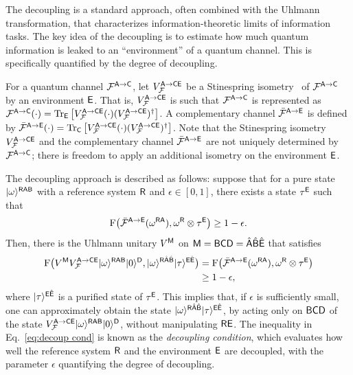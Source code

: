 The decoupling is a standard approach, often combined with the Uhlmann transformation, that characterizes information-theoretic limits of information tasks.
The key idea of the decoupling is to estimate how much quantum information is leaked to an ``environment'' of a quantum channel. This is specifically quantified by the degree of decoupling.


For a quantum channel $\cF^{\sA\rarr\sC}$, let $V_\cF^{\sA \rarr \sC\sE}$ be a Stinespring isometry~\cite{stinespring1955} of $\cF^{\sA \rarr \sC}$ by an environment $\sE$.
That is, $V_\cF^{\sA \rarr \sC\sE}$ is such that $\cF^{\sA\rarr \sC}$ is represented as $\cF^{\sA \rarr \sC}(\cdot) = \tr_{\sE}\big[V_\cF^{\sA\rarr \sC\sE}(\cdot)(V_\cF^{\sA \rarr \sC\sE})^\dag\big]$.
A complementary channel $\bar{\cF}^{\sA\rarr\sE}$ is defined by $\bar{\cF}^{\sA\rarr\sE}(\cdot) = \tr_\sC\big[V_\cF^{\sA\rarr\sC\sE}(\cdot)(V_\cF^{\sA\rarr\sC\sE})^\dag\big]$.
Note that the Stinespring isometry $V_\cF^{\sA \rarr \sC\sE}$ and the complementary channel $\bar{\cF}^{\sA\rarr\sE}$ are not uniquely determined by $\cF^{\sA\rarr \sC}$; there is freedom to apply an additional isometry on the environment $\sE$.

The decoupling approach is described as follows: suppose that for a pure state $\ket{\omega}^{\sR\sA\sB}$ with a reference system $\sR$ and $\epsilon \in [0, 1]$, there exists a state $\tau^\sE$ such that 
\begin{align}
\label{eq:decoup cond}
    \rF\big(\bar{\cF}^{\sA\rarr\sE}(\omega^{\sR\sA}), \omega^\sR \otimes \tau^\sE\big) \geq 1 - \epsilon.
\end{align}
Then, there is the Uhlmann unitary $V^\sM$ on $\sM = \sB\sC\sD = \hat{\sA}\hat{\sB}\hat{\sE}$
that satisfies
\begin{align}
    \rF\big(V^\sM V_\cF^{\sA\rarr\sC\sE}\ket{\omega}^{\sR\sA\sB}\ket{0}^\sD, \ket{\omega}^{\sR\hat{\sA}\hat{\sB}}\ket{\tau}^{\sE\hat{\sE}}\big)
    &= \rF\big(\bar{\cF}^{\sA\rarr\sE}(\omega^{\sR\sA}), \omega^\sR \otimes \tau^\sE\big) \\
    \label{inteq:80}
    &\geq 1 - \epsilon,
\end{align}
where $\ket{\tau}^{\sE\hat{\sE}}$ is a purified state of $\tau^\sE$.
This implies that, if $\epsilon$ is sufficiently small, one can approximately obtain the state  $\ket{\omega}^{\sR\hat{\sA}\hat{\sB}}\ket{\tau}^{\sE\hat{\sE}}$, by acting only on $\sB\sC\sD$ of the state 
$V_\cF^{\sA\rarr\sC\sE}\ket{\omega}^{\sR\sA\sB}\ket{0}^\sD$,
without manipulating $\sR\sE$.
The inequality in Eq.~\eqref{eq:decoup cond} is known as the \emph{decoupling condition}, which evaluates how well the reference system $\sR$ and the environment $\sE$ are decoupled, with the parameter $\epsilon$ quantifying the degree of decoupling.





